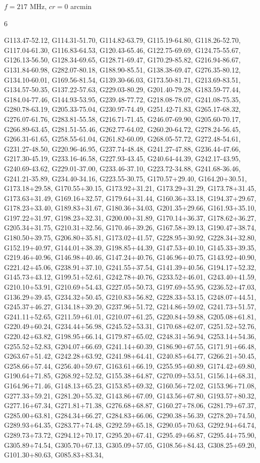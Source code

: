 \documentclass[12pt,a4paper]{article}
\newcommand{\numofcol}{6}
\begin{document}
$f = 217$ MHz, $cr = 0$ arcmin
\begin{multicols}{\numofcol}
\raggedright
\footnotesize 
G113.47-52.12, G114.31-51.70, G114.82-63.79, G115.19-64.80, G118.26-52.70, G117.04-61.30, G116.83-64.53, G120.43-65.46, G122.75-69.69, G124.75-55.67, G126.13-56.50, G128.34-69.65, G128.71-69.47, G170.29-85.82, G216.94-86.67, G131.84-60.98, G282.07-80.18, G188.90-85.51, G138.38-69.47, G276.35-80.12, G134.10-60.01, G169.56-81.54, G139.30-66.03, G173.50-81.71, G213.69-83.51, G134.57-50.35, G137.22-57.63, G229.03-80.29, G201.40-79.28, G183.59-77.44, G184.04-77.46, G144.93-53.95, G239.48-77.72, G218.08-78.07, G241.08-75.35, G280.78-63.19, G205.33-75.04, G230.97-74.49, G251.42-71.83, G265.17-68.32, G276.07-61.76, G283.81-55.58, G216.71-71.45, G246.07-69.90, G205.60-70.17, G266.89-63.45, G281.51-55.46, G262.77-64.02, G260.20-64.72, G278.24-56.45, G266.31-61.65, G258.55-61.04, G261.82-60.09, G268.05-57.72, G272.48-54.61, G231.27-48.50, G220.96-46.95, G237.74-48.48, G241.27-47.88, G236.44-47.66, G217.30-45.19, G233.16-46.58, G227.93-43.45, G240.64-44.39, G242.17-43.95, G240.69-43.62, G229.01-37.00, G233.46-37.10, G223.72-34.88, G241.68-36.46, G241.21-35.89, G234.40-34.16, G223.55-30.75, G170.57+29.40, G164.20+30.51, G173.18+29.58, G170.55+30.15, G173.92+31.21, G173.29+31.29, G173.78+31.45, G173.63+31.49, G169.16+32.57, G179.64+31.44, G160.36+33.18, G194.37+29.67, G178.23+33.40, G189.83+31.67, G180.36+34.03, G201.35+29.66, G161.93+35.10, G197.22+31.97, G198.23+32.31, G200.00+31.89, G170.14+36.37, G178.62+36.27, G205.34+31.75, G210.31+32.56, G170.46+39.26, G167.58+39.13, G190.47+38.74, G180.50+39.75, G206.80+35.81, G173.02+41.57, G228.95+30.92, G228.34+32.80, G152.19+40.97, G144.01+38.39, G198.85+44.39, G147.53+40.10, G145.33+39.35, G219.46+40.96, G146.98+40.46, G147.24+40.76, G146.96+40.75, G143.92+40.90, G221.42+45.06, G238.91+37.10, G241.55+37.54, G141.39+40.56, G194.17+52.32, G145.73+43.12, G199.51+52.61, G242.78+40.76, G233.52+46.01, G243.40+41.59, G210.10+53.91, G210.69+54.43, G227.05+50.73, G197.69+55.95, G236.52+47.03, G136.29+39.45, G234.32+50.45, G210.83+56.82, G228.33+53.15, G248.07+44.51, G245.37+46.27, G134.18+39.20, G237.96+51.72, G214.86+59.02, G241.73+51.57, G241.11+52.65, G211.59+61.01, G210.07+61.25, G220.84+59.88, G205.08+61.81, G220.49+60.24, G234.44+56.98, G245.52+53.31, G170.68+62.07, G251.52+52.76, G220.42+63.82, G198.95+66.14, G179.87+65.02, G248.31+56.94, G253.14+54.36, G255.52+52.83, G204.07+66.69, G241.14+60.39, G186.90+67.55, G171.91+66.48, G263.67+51.42, G242.28+63.92, G241.98+64.41, G240.85+64.77, G266.21+50.45, G258.66+57.44, G256.40+59.67, G163.61+66.19, G255.95+60.89, G174.42+69.80, G190.64+71.85, G268.92+52.52, G155.38+64.87, G270.09+53.51, G156.14+68.31, G164.96+71.46, G148.13+65.23, G153.85+69.32, G160.56+72.02, G153.96+71.08, G277.33+59.21, G281.20+55.32, G143.86+67.09, G143.56+67.80, G193.57+80.32, G277.16+67.34, G271.81+71.38, G276.68+68.87, G160.27+78.06, G281.79+67.37, G285.00+63.81, G284.34+66.27, G284.83+66.06, G290.38+56.39, G278.20+74.50, G289.93+64.35, G283.77+74.48, G292.59+65.18, G290.05+70.63, G292.94+64.74, G289.73+73.72, G294.12+70.17, G295.20+67.41, G295.49+66.87, G295.44+75.90, G305.89+74.54, G305.70+67.13, G305.09+57.05, G108.56+84.43, G308.25+69.20, G101.30+80.63, G085.83+83.34, 
\end{multicols}
\end{document}
